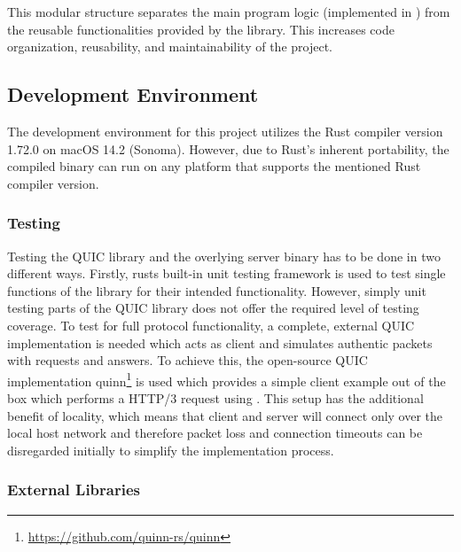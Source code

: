 This modular structure separates the main program logic (implemented in ) from the reusable functionalities
provided by the  library. This increases code organization, reusability, and maintainability of the project.

\subsection{Development Environment}

The development environment for this project utilizes the Rust compiler version 1.72.0 on macOS 14.2 (Sonoma). However, due to
Rust's inherent portability, the compiled binary can run on any platform that supports the mentioned Rust compiler version.

\subsubsection{Testing}

Testing the QUIC library and the overlying server binary has to be done in two different ways. Firstly, rusts built-in unit
testing framework is used to test single functions of the library for their intended functionality. However, simply unit
testing parts of the QUIC library does not offer the required level of testing coverage. To test for full protocol functionality,
a complete, external QUIC implementation is needed which acts as client and simulates authentic packets with requests and answers.
To achieve this, the open-source QUIC implementation quinn\footnote{\url{https://github.com/quinn-rs/quinn}} is used which provides
a simple client example out of the box which performs a HTTP/3 request using . This setup has the additional
benefit of locality, which means that client and server will connect only over the local host network and therefore packet loss
and connection timeouts can be disregarded initially to simplify the implementation process.

\subsubsection{External Libraries}

